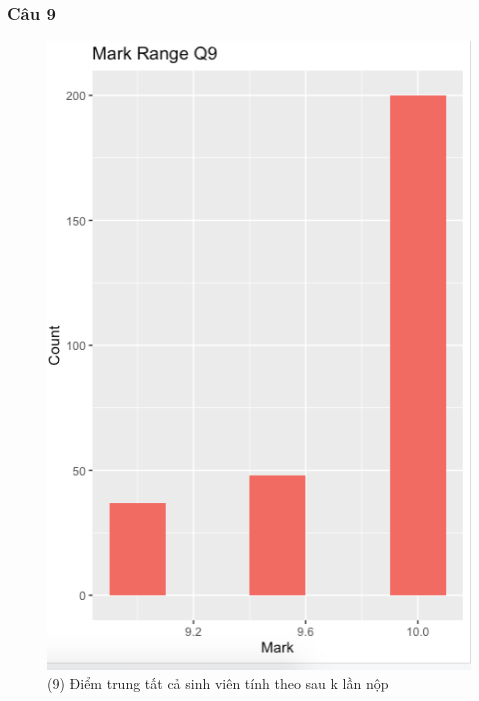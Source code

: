 \documentclass[a4paper]{article}
\theoremstyle{definition}
\begin{document}
\subsubsection{Câu 9}
\begin{figure}[!ht]
    \centering
    \includegraphics[scale=0.4]{Pics/q9-plot1.png}
    \caption{(9) Điểm trung tất cả sinh viên tính theo sau k lần nộp}
    \label{fig:my_label}
\end{figure}
\newpage
\end{document}
